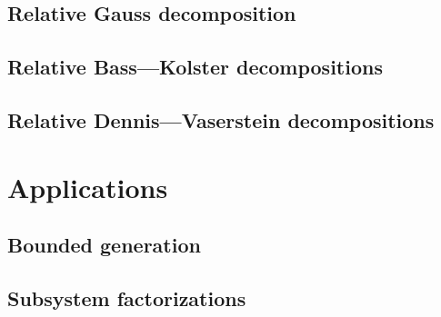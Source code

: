 \documentclass[oneside, 12pt]{amsart}
\theoremstyle{plain}
\numberwithin{equation}{section}
\numberwithin{lemma}{section}
\theoremstyle{definition}
\theoremstyle{remark}
\begin{document}
\subsection{Relative Gauss decomposition}\label{sec:gauss}

\subsection{Relative Bass---Kolster decompositions}\label{sec:bass-kolster}

\subsection{Relative Dennis---Vaserstein decompositions}\label{sec:dennis-vaserstein}


\section{Applications} \label{sec:applications}
\subsection{Bounded generation}\label{sec:boundgen}

\subsection{Subsystem factorizations}\label{sec:subsysfact}


\printbibliography
\end{document}
